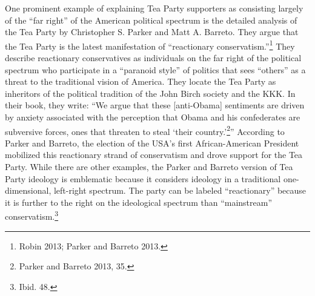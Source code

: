 \documentclass[12pt,]{article}
\begin{document}
One prominent example of explaining Tea Party supporters as consisting
largely of the ``far right'' of the American political spectrum is the
detailed analysis of the Tea Party by Christopher S. Parker and Matt A.
Barreto. They argue that the Tea Party is the latest manifestation of
``reactionary conservatism.''\footnote{Robin 2013; Parker and Barreto
  2013. } They describe reactionary conservatives as individuals on the
far right of the political spectrum who participate in a ``paranoid
style'' of politics that sees ``others'' as a threat to the traditional
vision of America. They locate the Tea Party as inheritors of the
political tradition of the John Birch society and the KKK. In their
book, they write: ``We argue that these {[}anti-Obama{]} sentiments are
driven by anxiety associated with the perception that Obama and his
confederates are subversive forces, ones that threaten to steal `their
country.'\footnote{Parker and Barreto 2013, 35. }'' According to Parker
and Barreto, the election of the USA's first African-American President
mobilized this reactionary strand of conservatism and drove support for
the Tea Party. While there are other examples, the Parker and Barreto
version of Tea Party ideology is emblematic because it considers
ideology in a traditional one-dimensional, left-right spectrum. The
party can be labeled ``reactionary'' because it is further to the right
on the ideological spectrum than ``mainstream'' conservatism.\footnote{Ibid.
  48. }
\end{document}
